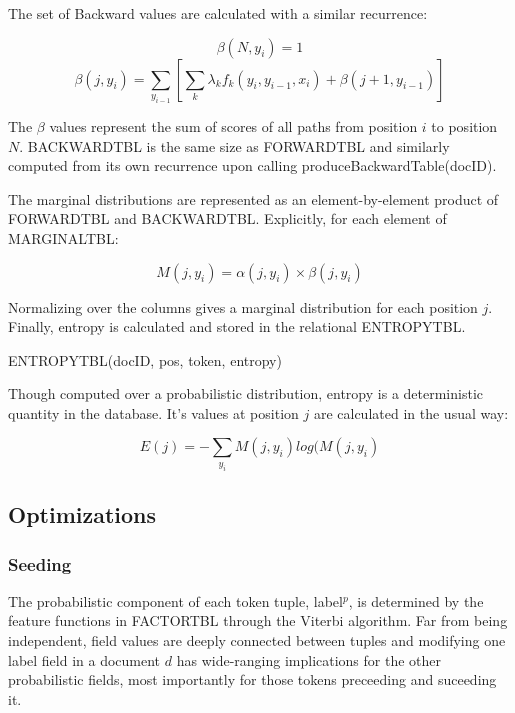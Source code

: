 The set of Backward values are calculated with a similar recurrence:

\begin{equation}
\beta(N,y_{i}) = 1
\end{equation}
\begin{equation}
\label{beta}
\beta(j,y_{i}) = \sum_{y_{i-1}}[\sum_{k}\lambda_{k}f_{k}(y_{i},y_{i-1},x_{i}) + \beta(j+1,y_{i-1})]
\end{equation}

The $\beta$ values represent the sum of scores of all paths from position $i$ to position $N$.  B{\small ACKWARD}T{\small BL} is the same size as F{\small ORWARD}T{\small BL} and similarly computed from its own recurrence upon calling produceBackwardTable(docID).

The marginal distributions are represented as an element-by-element product of F{\small ORWARD}T{\small BL} and B{\small ACKWARD}T{\small BL}.  Explicitly, for each element of M{\small ARGINAL}T{\small BL}:

\begin{equation}
M(j,y_{i}) = \alpha(j,y_{i})\times\beta(j,y_{i})
\end{equation}

Normalizing over the columns gives a marginal distribution for each position $j$. Finally, entropy is calculated and stored in the relational E{\small NTROPY}T{\small BL}.

\vspace{.1in}
\centerline{E{\small NTROPY}T{\small BL}(docID, pos, token, entropy)}
\vspace{.1in}

Though computed over a probabilistic distribution, entropy is a deterministic quantity in the database.  It's values at position $j$ are calculated in the usual way:

\begin{equation}
E(j) = -\sum_{y_{i}}M(j,y_{i})log(M(j,y_{i})
\end{equation}

\subsection{Optimizations}

\subsubsection{Seeding}

The probabilistic component of each token tuple, label$^{p}$, is determined by the feature functions in F{\small ACTOR}T{\small BL} through the Viterbi algorithm.  Far from being independent, field values are deeply connected between tuples and modifying one label field in a document $d$ has wide-ranging implications for the other probabilistic fields, most importantly for those tokens preceeding and suceeding it.

